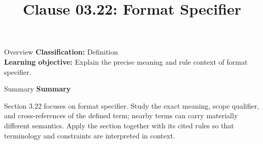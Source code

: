 \documentclass[10pt,letterpaper]{article}
\title{Clause 03.22: Format Specifier}
\author{}
\date{}
\begin{document}
\maketitle
\begin{CornellOverviewBox}{Overview}
\textbf{Classification:} Definition\\[2pt]
\textbf{Learning objective:} Explain the precise meaning and rule context of format specifier.
\end{CornellOverviewBox}\begin{CornellSummaryBox}{Summary}
{\sffamily\bfseries\color{Accent} Summary}\par\vspace{3pt}Section 3.22 focuses on format specifier. Study the exact meaning, scope qualifier, and cross-references of the defined term; nearby terms can carry materially different semantics. Apply the section together with its cited rules so that terminology and constraints are interpreted in context.
\end{CornellSummaryBox}
\end{document}
